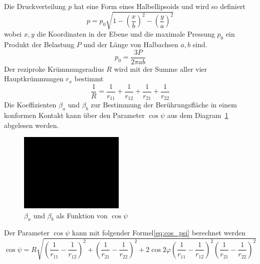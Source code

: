 Die Druckverteilung $p$ hat eine Form eines Halbellipsoids und wird so definiert
\begin{equation}
    \label{eq:druckverteilung}
    p = p_0  \sqrt{1 - \left( \frac{x}{b} \right)^2 - \left( \frac{y}{a} \right)^2}
\end{equation}
%
wobei $x, y$ die Koordinaten in der Ebene und die maximale Pressung $p_0$ ein Produkt der Belastung $P$ und der Länge von Halbachsen $a, b$ sind.
\begin{equation}
    \label{eq:maximale_pressung}
    p_0 = \frac{3  P}{2  \pi  a  b}
\end{equation}
%
Der reziproke Krümmungsradius $R$ wird mit der Summe aller vier Hauptkrümmungen $r_x$ bestimmt
\begin{equation}
    \label{eq:kruemmungsradius}
    \frac{1}{R} = \frac{1}{r_{11}} + \frac{1}{r_{12}} + \frac{1}{r_{21}} + \frac{1}{r_{22}}
\end{equation}
%
Die Koeffizienten $\beta_a$ und $\beta_b$ zur Bestimmung der Berührungsfläche in einem konformen Kontakt kann über den Parameter $\cos{\psi}$ aus dem Diagram~\ref{fig:beta_a_und_beta_b_als_funktion_der_cos_psi} abgelesen werden.
\begin{figure}[htb]
    \centering
    \includegraphics[width=5cm]{./images/blank_img.jpg}
    \caption{$\beta_a$ und $\beta_b$ als Funktion von $\cos{\psi}$}
    \label{fig:beta_a_und_beta_b_als_funktion_der_cos_psi}
\end{figure}
%

Der Parameter $\cos{\psi}$ kann mit folgender Formel\ref{eq:cos_psi} berechnet werden
\begin{equation}
    \label{eq:cos_psi}
    \cos{\psi} = R  \sqrt{\left( \frac{1}{r_{11}} - \frac{1}{r_{12}} \right)^2 
                                + \left( \frac{1}{r_{21}} - \frac{1}{r_{22}} \right)^2 
                                + 2  \cos{2 \varphi} 
                                 \left( \frac{1}{r_{11}} - \frac{1}{r_{12}}  \right)^2 
                                 \left( \frac{1}{r_{21}} - \frac{1}{r_{22}} \right)^2}
\end{equation}
%

